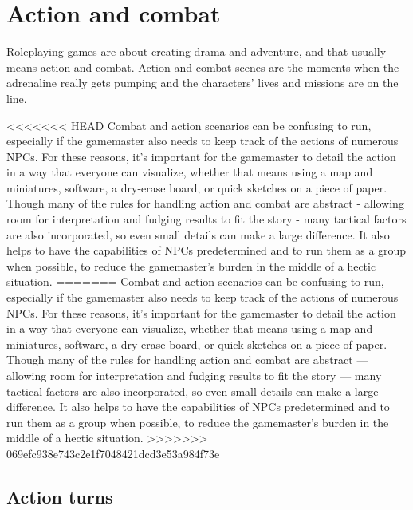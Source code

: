 



\chapter{Action and combat} \label{chap:action-combat} 

Roleplaying games are about creating drama and adventure, and that usually means action and combat. Action and combat scenes are the moments when the adrenaline really gets pumping and the characters’ lives and missions are on the line. 

<<<<<<< HEAD Combat and action scenarios can be confusing to run, especially if the gamemaster also needs to keep track of the actions of numerous NPCs. For these reasons, it’s important for the gamemaster to detail the action in a way that everyone can visualize, whether that means using a map and miniatures, software, a dry-erase board, or quick sketches on a piece of paper. Though many of the rules for handling action and combat are abstract - allowing room for interpretation and fudging results to fit the story - many tactical factors are also incorporated, so even small details can make a large difference. It also helps to have the capabilities of NPCs predetermined and to run them as a group when possible, to reduce the gamemaster’s burden in the middle of a hectic situation. ======= Combat and action scenarios can be confusing to run, especially if the gamemaster also needs to keep track of the actions of numerous NPCs. For these reasons, it’s important for the gamemaster to detail the action in a way that everyone can visualize, whether that means using a map and miniatures, software, a dry-erase board, or quick sketches on a piece of paper. Though many of the rules for handling action and combat are abstract --- allowing room for interpretation and fudging results to fit the story --- many tactical factors are also incorporated, so even small details can make a large difference. It also helps to have the capabilities of NPCs predetermined and to run them as a group when possible, to reduce the gamemaster’s burden in the middle of a hectic situation. >>>>>>> 069efc938e743c2e1f7048421dcd3e53a984f73e 



\section{Action turns} \label{sec:combat-action-turns} 

